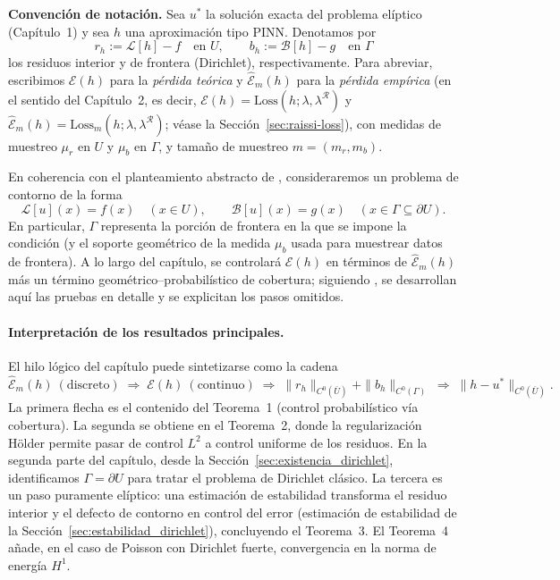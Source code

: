 \medskip
\noindent\textbf{Convención de notación.}
Sea $u^*$ la solución exacta del problema elíptico (Capítulo~1) y sea $h$ una aproximación tipo PINN.
Denotamos por
\[
r_h:=\mathcal{L}[h]-f\quad\text{en }U,
\qquad
b_h:=\mathcal{B}[h]-g\quad\text{en }\Gamma
\]
los residuos interior y de frontera (Dirichlet), respectivamente. Para abreviar, escribimos
$\mathcal{E}(h)$ para la \emph{pérdida teórica} y $\widehat{\mathcal{E}}_m(h)$ para la \emph{pérdida empírica}
(en el sentido del Capítulo~2, es decir, $\mathcal{E}(h)=\text{Loss}(h;\lambda,\lambda^{\mathcal{R}})$ y
$\widehat{\mathcal{E}}_m(h)=\text{Loss}_m(h;\lambda,\lambda^{\mathcal{R}})$; véase la Sección~\ref{sec:raissi-loss}), con medidas de muestreo $\mu_r$ en $U$ y $\mu_b$ en $\Gamma$,
y tamaño de muestreo $m=(m_r,m_b)$.

En coherencia con el planteamiento abstracto de \cite{shin2020convergence}, consideraremos un problema de contorno de la forma
\begin{equation}\label{eq:planteamiento_abstracto}
\mathcal{L}[u](x)=f(x)\quad (x\in U),\qquad \mathcal{B}[u](x)=g(x)\quad (x\in\Gamma\subseteq\partial U).
\end{equation}
En particular, $\Gamma$ representa la porción de frontera en la que se impone la condición (y el soporte geométrico de la medida $\mu_b$ usada para muestrear datos de frontera). A lo largo del capítulo, se controlará $\mathcal{E}(h)$ en términos de
$\widehat{\mathcal{E}}_m(h)$ más un término geométrico–probabilístico de cobertura; siguiendo
\cite{shin2020convergence}, se desarrollan aquí las pruebas en detalle y se explicitan los pasos omitidos.

\medskip
\paragraph{Interpretación de los resultados principales.}
El hilo lógico del capítulo puede sintetizarse como la cadena
\[
\widehat{\mathcal{E}}_m(h)\ (\text{discreto}) \;\Rightarrow\; \mathcal{E}(h)\ (\text{continuo})
\;\Rightarrow\; \|r_h\|_{C^0(\overline U)}+\|b_h\|_{C^0(\Gamma)}
\;\Rightarrow\; \|h-u^*\|_{C^0(\overline U)}.
\]
La primera flecha es el contenido del Teorema~1 (control probabilístico vía cobertura).
La segunda se obtiene en el Teorema~2, donde la regularización Hölder permite pasar de control $L^2$ a control uniforme de los residuos.
En la segunda parte del capítulo, desde la Sección~\ref{sec:existencia_dirichlet}, identificamos $\Gamma=\partial U$ para tratar el problema de Dirichlet clásico.
La tercera es un paso puramente elíptico: una estimación de estabilidad transforma el residuo interior y el defecto de contorno en
control del error (estimación de estabilidad de la Sección~\ref{sec:estabilidad_dirichlet}), concluyendo el Teorema~3. El Teorema~4 añade, en el caso de Poisson con Dirichlet fuerte,
convergencia en la norma de energía $H^1$.

